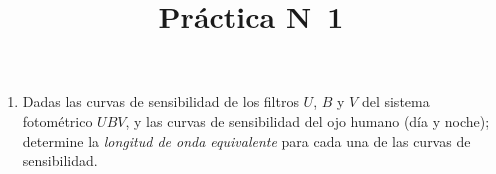 \documentclass[12pt,spanish,a4paper]{practice}
\begin{document}
  \title{Práctica N\textdegree\ 1}
  \maketitle

  \begin{enumerate}[wide, labelwidth=!, labelindent=0pt, label=\textbf{\textrm{\arabic*)}}, ref=\arabic*]
    \item \label{prob:1} Dadas las curvas de sensibilidad de los filtros $U$, $B$ y $V$ del sistema fotométrico $UBV$, y las curvas de sensibilidad del ojo humano (día y noche); determine la \emph{longitud de onda equivalente} para cada una de las curvas de sensibilidad.


\end{enumerate}
\end{document}
